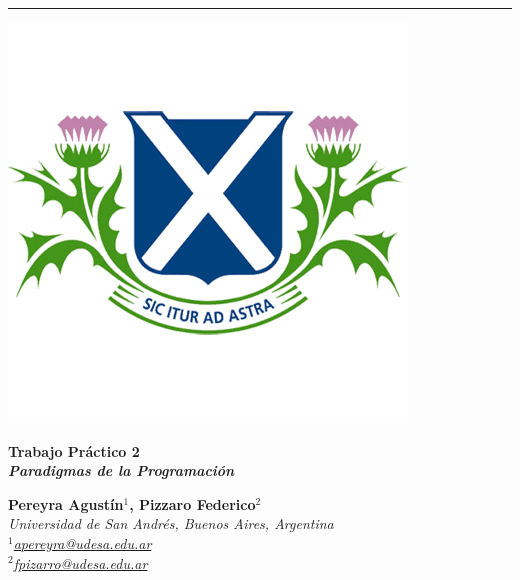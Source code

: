 \documentclass[11pt, a4paper]{article}
\begin{document}
\vspace*{1cm}

{\noindent\rule{\textwidth}{0.5pt}}
\noindent
\begin{minipage}{0.24\textwidth}
    \includegraphics[width=\linewidth]{figures/logo2.png}
\end{minipage}
\hspace{0.02\textwidth}
\begin{minipage}{0.7\textwidth}
    {\fontsize{32}{36}\selectfont\bfseries\color{udesaBlue}\selectfont Trabajo Práctico 2}\\
    {\fontsize{20}{24}\selectfont\bfseries\itshape\color{udesaGreen} Paradigmas de la Programación}
\end{minipage}

\begin{minipage}{0.8\textwidth}
    {\large\textbf{\color{udesaBlue} Pereyra Agustín$^{1}$, \color{udesaGreen}Pizzaro Federico$^{2}$}}\\
    {\itshape\small
    Universidad de San Andrés, Buenos Aires, Argentina\\
    $^1$\href{mailto:apereyra@udesa.edu.ar}{apereyra@udesa.edu.ar}\\
    $^2$\href{mailto:fpizarro@udesa.edu.ar}{fpizarro@udesa.edu.ar}
}
\end{minipage}
\vspace{0.5cm}
\end{document}
